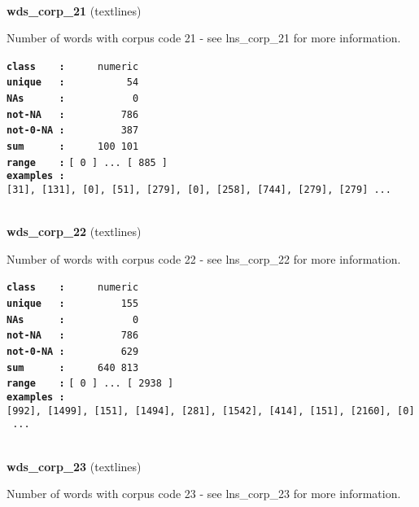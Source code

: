 \documentclass[]{article}
\begin{document}
~

\textbf{wds\_corp\_21} (textlines)

Number of words with corpus code 21 - see lns\_corp\_21 for more
information.

\textbf{\texttt{class\ \ \ \ :}} \texttt{~~~~~numeric}\\
\textbf{\texttt{unique\ \ \ :}} \texttt{~~~~~~~~~~54}\\
\textbf{\texttt{NAs\ \ \ \ \ \ :}} \texttt{~~~~~~~~~~~0}\\
\textbf{\texttt{not-NA\ \ \ :}} \texttt{~~~~~~~~~786}\\
\textbf{\texttt{not-0-NA\ :}} \texttt{~~~~~~~~~387}\\
\textbf{\texttt{sum\ \ \ \ \ \ :}} \texttt{~~~~~100~101}\\
\textbf{\texttt{range\ \ \ \ :}}
\texttt{{[}\ 0\ {]}\ ...\ {[}\ 885\ {]}}\\
\textbf{\texttt{examples\ :}}
\texttt{{[}31{]},\ {[}131{]},\ {[}0{]},\ {[}51{]},\ {[}279{]},\ {[}0{]},\ {[}258{]},\ {[}744{]},\ {[}279{]},\ {[}279{]}\ ...}\\

~

\textbf{wds\_corp\_22} (textlines)

Number of words with corpus code 22 - see lns\_corp\_22 for more
information.

\textbf{\texttt{class\ \ \ \ :}} \texttt{~~~~~numeric}\\
\textbf{\texttt{unique\ \ \ :}} \texttt{~~~~~~~~~155}\\
\textbf{\texttt{NAs\ \ \ \ \ \ :}} \texttt{~~~~~~~~~~~0}\\
\textbf{\texttt{not-NA\ \ \ :}} \texttt{~~~~~~~~~786}\\
\textbf{\texttt{not-0-NA\ :}} \texttt{~~~~~~~~~629}\\
\textbf{\texttt{sum\ \ \ \ \ \ :}} \texttt{~~~~~640~813}\\
\textbf{\texttt{range\ \ \ \ :}}
\texttt{{[}\ 0\ {]}\ ...\ {[}\ 2938\ {]}}\\
\textbf{\texttt{examples\ :}}
\texttt{{[}992{]},\ {[}1499{]},\ {[}151{]},\ {[}1494{]},\ {[}281{]},\ {[}1542{]},\ {[}414{]},\ {[}151{]},\ {[}2160{]},\ {[}0{]}\ ...}\\

~

\textbf{wds\_corp\_23} (textlines)

Number of words with corpus code 23 - see lns\_corp\_23 for more
information.
\end{document}
